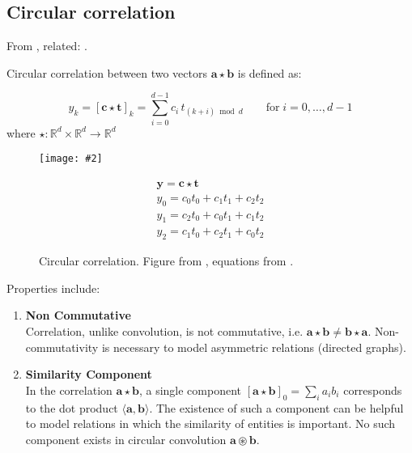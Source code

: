 \documentclass{article}
\makeatletter
\DeclareRobustCommand{\ie}{i.e.\@\xspace}
\newcommand{\gph}[2]{\texttt{[image: \#2]}}
\newcommand{\tbf}[1]{\textbf{#1}}
\makeatother
\begin{document}
\subsection{Circular correlation}
\label{subsec: Circular correlation}

From \cite{nickel2016holographic,plate1995holographic}, related: \cite{tay2017learning}.

Circular correlation between two vectors $\mathbf{a} \star \mathbf{b}$ is defined as:

\begin{equation}
    y_k = \left[\mathbf{c} \star \mathbf{t}\right]_{k} = \sum_{i=0}^{d-1} c_{i} \, t_{(k+i) \bmod d} \qquad \text{for} \; i = 0, \dotsc, d-1
\end{equation}
\noindent
where $\star : \mathbb{R}^{d} \times \mathbb{R}^{d} \rightarrow \mathbb{R}^{d}$

\begin{figure}[h]
\begin{minipage}{0.5\linewidth}
    \begin{center}
    \gph{0.5}{images/circular_correlation.png}
    \end{center}
\end{minipage}
\begin{minipage}{0.5\linewidth}
    \begin{equation}
        \begin{array}{c}{\mathbf{y} = \mathbf{c} \star \mathbf{t}} \\ {y_{0}=c_{0} t_{0}+c_{1} t_{1}+c_{2} t_{2}} \\ {y_{1}=c_{2} t_{0}+c_{0} t_{1}+c_{1} t_{2}} \\ {y_{2}=c_{1} t_{0}+c_{2} t_{1}+c_{0} t_{2}}\end{array}
    \end{equation}
\end{minipage}
\caption{Circular correlation. Figure from \cite{plate1995holographic}, equations from \cite{plate1995holographic,nickel2016holographic}.}
\end{figure}

Properties include:

\begin{enumerate}[label=\roman*)]
    \item {\tbf{Non Commutative} \\
            Correlation, unlike convolution, is not commutative, \ie{} $\mathbf{a} \star \mathbf{b} \neq \mathbf{b} \star \mathbf{a}$. Non-commutativity is necessary to model asymmetric relations (directed graphs).}
    \item {\tbf{Similarity Component} \\
            In the correlation $\mathbf{a} \star \mathbf{b}$, a single component $[\mathbf{a} \star \mathbf{b}]_{0}=\sum_{i} a_{i} b_{i}$ corresponds to the dot product $\langle\mathbf{a}, \mathbf{b}\rangle$. The existence of such a component can be helpful to model relations in which the similarity of entities is important. No such component exists in circular convolution $\mathbf{a} \circledast \mathbf{b}$.}
\end{enumerate}
\end{document}
